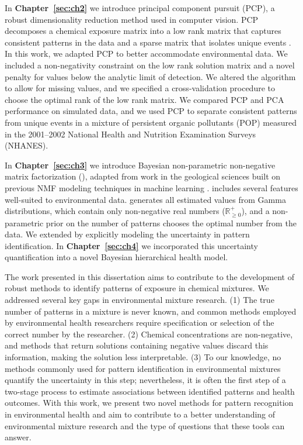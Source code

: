 In \textbf{Chapter~\ref{sec:ch2}} we introduce principal component pursuit (PCP), a robust dimensionality reduction method used in computer vision. PCP decomposes a chemical exposure matrix into a low rank matrix that captures consistent patterns in the data and a sparse matrix that isolates unique events \citep{candes2011robust,zhou2010stable}. In this work, we adapted PCP to better accommodate environmental data. We included a non-negativity constraint on the low rank solution matrix and a novel penalty for values below the analytic limit of detection. We altered the algorithm to allow for missing values, and we specified a cross-validation procedure to choose the optimal rank of the low rank matrix. We compared PCP and PCA performance on simulated data, and we used PCP to separate consistent patterns from unique events in a mixture of persistent organic pollutants (POP) measured in the 2001--2002 National Health and Nutrition Examination Surveys (NHANES).

In \textbf{Chapter~\ref{sec:ch3}} we introduce Bayesian non-parametric non-negative matrix factorization (\bnmfc), adapted from work in the geological sciences built on previous NMF modeling techniques in machine learning \citep{holtzman2018machine, lee1999learning, cemgil2008bayesian, paisley2014bayesian}. \bnmf includes several features well-suited to environmental data. \bnmf generates all estimated values from Gamma distributions, which contain only non-negative real numbers ($\mathbb R_{\geq 0}^+$), and a non-parametric prior on the number of patterns chooses the optimal number from the data. We extended \bnmf by explicitly modeling the uncertainty in pattern identification. In \textbf{Chapter~\ref{sec:ch4}} we incorporated this uncertainty quantification into a novel Bayesian hierarchical health model. 

The work presented in this dissertation aims to contribute to the development of robust methods to identify patterns of exposure in chemical mixtures. We addressed several key gaps in environmental mixture research. (1) The true number of patterns in a mixture is never known, and common methods employed by environmental health researchers require specification or selection of the correct number by the researcher. (2) Chemical concentrations are non-negative, and methods that return solutions containing negative values discard this information, making the solution less interpretable. (3) To our knowledge, no methods commonly used for pattern identification in environmental mixtures quantify the uncertainty in this step; nevertheless, it is  often the first step of a two-stage process to estimate associations between identified patterns and health outcomes. With this work, we present two novel methods for pattern recognition in environmental health and aim to contribute to a better understanding of environmental mixture research and the type of questions that these tools can answer.

\clearpage
